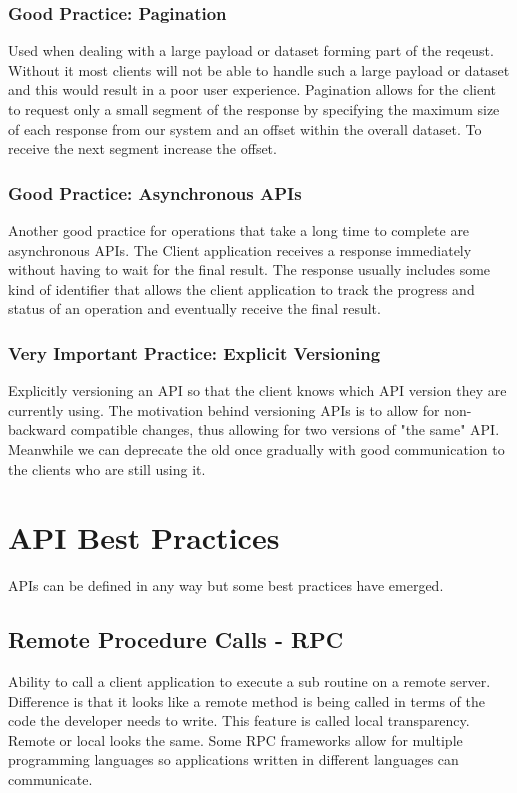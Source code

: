 \subsubsection{Good Practice: Pagination}
Used when dealing with a large payload or dataset forming part of the reqeust.
Without it most clients will not be able to handle such a large payload or dataset and this would result in a poor user experience.
Pagination allows for the client to request only a small segment of the response by specifying the maximum size of each response from our system
and an offset within the overall dataset.
To receive the next segment increase the offset.

\subsubsection{Good Practice: Asynchronous APIs}
Another good practice for operations that take a long time to complete are asynchronous APIs.
The Client application receives a response immediately without having to wait for the final result.
The response usually includes some kind of identifier that allows the client application to track the progress
and status of an operation and eventually receive the final result.

\subsubsection{Very Important Practice: Explicit Versioning}
Explicitly versioning an API so that the client knows which API version they are currently using.
The motivation behind versioning APIs is to allow for non-backward compatible changes, thus allowing for two versions of "the same" API\@.
Meanwhile we can deprecate the old once gradually with good communication to the clients who are still using it.


\section{API Best Practices}
APIs can be defined in any way but some best practices have emerged.

\subsection{Remote Procedure Calls - RPC}
Ability to call a client application to execute a sub routine on a remote server.
Difference is that it looks like a remote method is being called in terms of the code the developer needs to write.
This feature is called local transparency.
Remote or local looks the same.
Some RPC frameworks allow for multiple programming languages so applications written in different languages can communicate.


